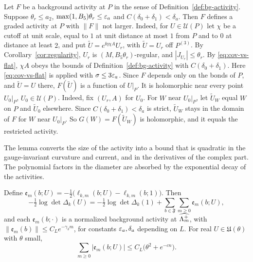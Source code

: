 \begin{remark}\label{rem:bg-to-graded}
Let $F$ be a background activity at $P$ in the sense of Definition~\ref{def:bg-activity}. Suppose $\theta_r\le a_2$, $\max(1,B_5)\theta_r\le\varepsilon_a$ and $C(\delta_0+\delta_1)<\delta_a$. Then $F$ defines a graded activity at $P$ with $\|F\|$ not larger. Indeed, for $U\in\mathcal U(P)$ let $\chi$ be a cutoff at unit scale, equal to $1$ at unit distance at most $1$ from $P$ and to $0$ at distance at least $2$, and put $\tilde U=e^{\ii\eta\chi A}U_r$, with $\tilde U=U_r$ off $P^{(3)}$. By Corollary~\ref{cor:regularity}, $U_r$ is $(M,B_5\theta_r)$-regular, and $|J_{U_r}|\le\theta_r$. By \eqref{eq:cov-vs-flat}, $\chi A$ obeys the bounds of Definition~\ref{def:bg-activity} with $C(\delta_0+\delta_1)$. Here \eqref{eq:cov-vs-flat} is applied with $\sigma\le3\varepsilon_a$. Since $F$ depends only on the bonds of $P$, and $\tilde U=U$ there, $F(\tilde U)$ is a function of $U|_P$. It is holomorphic near every point $U_0|_P$, $U_0\in\mathcal U(P)$. Indeed, fix $(U_r,A)$ for $U_0$. For $W$ near $U_0|_P$, let $\tilde U_W$ equal $W$ on $P$ and $\tilde U_0$ elsewhere. Since $C(\delta_0+\delta_1)<\delta_a$ is strict, $\tilde U_W$ stays in the domain of $F$ for $W$ near $U_0|_P$. So $G(W)=F(\tilde U_W)$ is holomorphic, and it equals the restricted activity.
\end{remark}

The lemma converts the size of the activity into a bound that is quadratic in the gauge-invariant curvature and current, and in the derivatives of the complex part. The polynomial factors in the diameter are absorbed by the exponential decay of the activities.

\begin{corollary}\label{cor:one-loop}
Define $\mathfrak e_m(b;U)=-\frac12\big(\ell_{k,m}(b;U)-\ell_{k,m}(b;1)\big)$. Then
\[
-\tfrac12\log\det\Delta_k(U)=-\tfrac12\log\det\Delta_k(1)+\sum_{b\in\mathfrak F}\sum_{m\ge0}\mathfrak e_m(b;U),
\]
and each $\mathfrak e_m(b;\cdot)$ is a normalized background activity at $\widehat{\Lambda_m^+}$, with $\|\mathfrak e_m(b)\|\le C_Le^{-\gamma_3m}$, for constants $\varepsilon_a,\delta_a$ depending on $L$. For real $U\in\mathfrak U(\theta)$ with $\theta$ small,
\[
\sum_{m\ge0}|\mathfrak e_m(b;U)|\le C_L\big(\theta^2+e^{-cn}\big) .
\]
\end{corollary}

